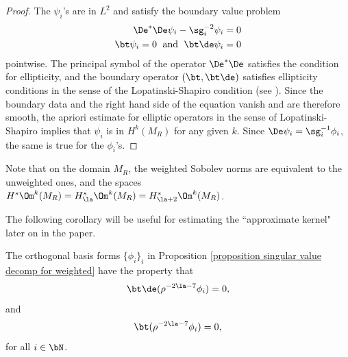 \documentclass[hidelinks, 12pt, oneside, reqno]{amsart}
\begin{document}
\begin{proof}
    The $\psi_i$'s are in $L^2$ and satisfy the boundary value problem
    \begin{align*}
        \De^* \De \psi_i - \sg_i^{-2}\psi_i &= 0\\
        \bt \psi_i = 0 \; \textrm{ and } \; \bt \de \psi_i &= 0 
    \end{align*}
    pointwise. The principal symbol of the operator $\De^*\De$ satisfies the condition for ellipticity, and the boundary operator $(\bt, \bt \de)$ satisfies ellipticity conditions in the sense of the Lopatinski-Shapiro condition (see \cite[Lemma 1.6.5]{HodgeDecompSchwarz}). Since the boundary data and the right hand side of the equation vanish and are therefore smooth, the apriori estimate \cite[(ii), Theorem 1.6.2]{HodgeDecompSchwarz} for elliptic operators in the sense of Lopatinski-Shapiro implies that $\psi_i$ is in $H^k(M_R)$ for any given $k$. Since $\De \psi_i = \sg_i^{-1} \phi_i$, the same is true for the $\phi_i$'s.
\end{proof}

\begin{rmk}
Note that on the domain $M_R$, the weighted Sobolev norms are equivalent to the unweighted ones, and the spaces $H^s\Om^k(M_R) = H^s_{\la}\Om^k(M_R) = H^s_{\la + 2}\Om^k(M_R)$.
\end{rmk}

The following corollary will be useful for estimating the ``approximate kernel" later on in the paper.

\begin{cor}\label{corollary vanishing of boundary terms}
The orthogonal basis forms $\{\phi_i\}_i$ in Proposition \ref{proposition singular value decomp for weighted} have the property that
\[
\bt \de (\rho^{-2\la -7} \phi_i) = 0,
\]
and
\[
\bt (\rho^{-2\la -7} \phi_i) = 0,
\]
for all $i \in \bN$.
\end{cor}
\end{document}
